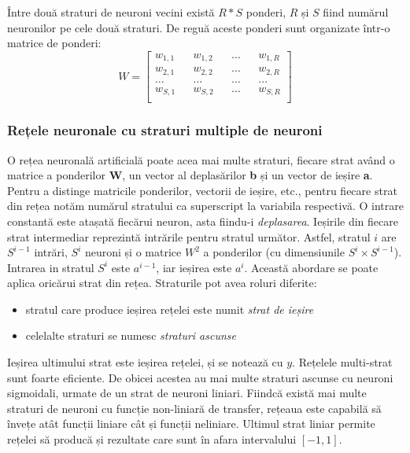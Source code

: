 Între două straturi de neuroni vecini există $R*S$ ponderi, $R$ și $S$ fiind numărul neuronilor pe cele două straturi. De reguă aceste ponderi sunt organizate într-o matrice de ponderi:
\begin{equation}
	W = \begin{bmatrix}
		w_{1,1} && w_{1,2} && \dots && w_{1,R} \\
		w_{2,1} && w_{2,2} && \dots && w_{2,R} \\
		\dots && \dots && \dots && \dots\\
		w_{S,1} && w_{S,2} && \dots && w_{S, R} \\
	\end{bmatrix}
\end{equation}



\subsubsection{Rețele neuronale cu straturi multiple de neuroni}
O rețea neuronală artificială poate acea mai multe straturi, fiecare strat având o matrice a ponderilor \textbf{W}, un vector al deplasărilor \textbf{b} și un vector de ieșire \textbf{a}. Pentru a distinge matricile ponderilor, vectorii de ieșire, etc., pentru fiecare strat din rețea notăm numărul stratului ca superscript la variabila respectivă. O intrare constantă este atașată fiecărui neuron, asta fiindu-i \textit{deplasarea}. Ieșirile din fiecare strat intermediar reprezintă intrările pentru stratul următor. Astfel, stratul $i$ are $S^{i-1}$ intrări, $S^{i}$ neuroni și o matrice $W^2$ a ponderilor (cu dimensiunile $S^{i}\times S^{i-1}$). Intrarea in stratul $S^{i}$ este $a^{i-1}$, iar ieșirea este $a^{i}$. Această abordare se poate aplica oricărui strat din rețea.\newline
Straturile pot avea roluri diferite:
\begin{itemize}
	\item stratul care produce ieșirea rețelei este numit \textit{strat de ieșire}
	\item celelalte straturi se numesc \textit{straturi ascunse}
\end{itemize}
Ieșirea ultimului strat este ieșirea rețelei, și se notează cu $y$. Rețelele multi-strat sunt foarte eficiente. De obicei acestea au mai multe straturi ascunse cu neuroni sigmoidali, urmate de un strat de neuroni liniari. Fiindcă există mai multe straturi de neuroni cu funcție non-liniară de transfer, rețeaua este capabilă să învețe atât funcții liniare cât și funcții neliniare. Ultimul strat liniar permite rețelei să producă și rezultate care sunt în afara intervalului $[-1, 1]$.



